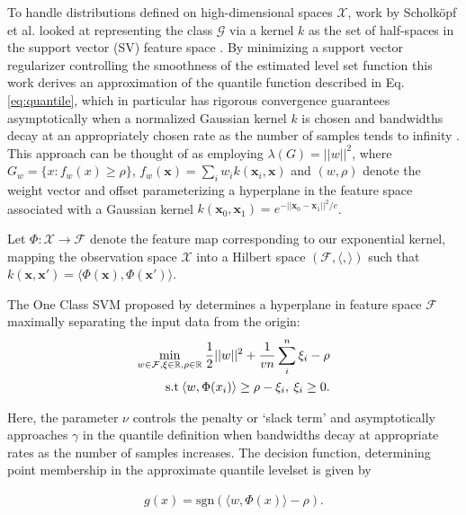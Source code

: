 \documentclass[10pt, conference]{ieeeconf}      %
\newcommand{\bx}{\mathbf{x}}
\begin{document}
To handle distributions defined on high-dimensional spaces $\mathcal{X}$, work by Scholk{\"o}pf et al. looked at representing the class $\mathcal{G}$ via a kernel $k$ as the set of half-spaces in the support vector (SV) feature space \cite{scholkopf2001estimating}. 
By minimizing a support vector regularizer controlling the smoothness of the estimated level set function this work
derives an approximation of the quantile function described in Eq. \ref{eq:quantile}, which in particular has rigorous
convergence guarantees asymptotically when a normalized Gaussian kernel $k$ is chosen and bandwidths decay at an
appropriately chosen rate as the number of samples tends to infinity \cite{vert2006consistency}.
This approach can be thought of as employing $\lambda(G) = ||w||^2$, where $G_w = \lbrace x: f_w(x) \geq \rho \rbrace$,
$f_w(\mathbf{x}) = \sum_i w_i k(\mathbf{x}_i, \mathbf{x})$
and $(w,\rho)$ denote the weight vector and offset parameterizing a hyperplane in the feature space associated with a
Gaussian kernel $k(\bx_0,\bx_1) = e^{-||\bx_0 - \bx_1||^2/c}$.


Let $\Phi:\mathcal{X}\to \mathcal{F}$ denote the feature map corresponding to our exponential kernel, mapping the
observation space $\mathcal{X}$ into a Hilbert space $(\mathcal{F}, \langle, \rangle)$ such that $k(\bx, \bx') = \langle
\Phi(\bx), \Phi(\bx')\rangle$.

The One Class SVM proposed by \cite{scholkopf2001estimating} determines a hyperplane in feature space $\mathcal{F}$
maximally separating the input data from the origin:
\vspace{-2ex}
\begin{align}\label{eq:primal_sup}
    \underset{w\in \mathcal{F}, \mathbf{\xi} \in \mathbb{R}, \rho \in \mathbb{R}}{\mbox{min}}\: \frac{1}{2}||w||^2+\frac{1}{vn} \sum^n_i \xi_i - \rho\\
\mbox{s.t} \: \langle w,\Phi(x_i) \rangle \geq \rho - \xi_i, \: \xi_i \geq 0 \notag.
\end{align}

Here, the parameter $\nu$ controls the penalty or `slack term' and asymptotically approaches $\gamma$ \cite{vert2006consistency}
in the quantile definition when bandwidths decay at appropriate rates as the number of samples increases. The decision
function, determining point membership in the approximate quantile levelset is given by

\vspace{-2ex}
\begin{align}\label{eq:decision_func}
g(x) = \mbox{sgn}(\langle w,\Phi(x) \rangle-\rho).
\end{align}
\end{document}
